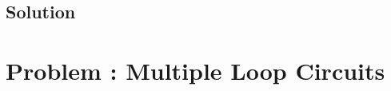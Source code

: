 \documentclass[solutions]{esg8022pset}
\begin{document}
\subsection{Solution}

\section{Problem \thesection: Multiple Loop Circuits}
\end{document}
